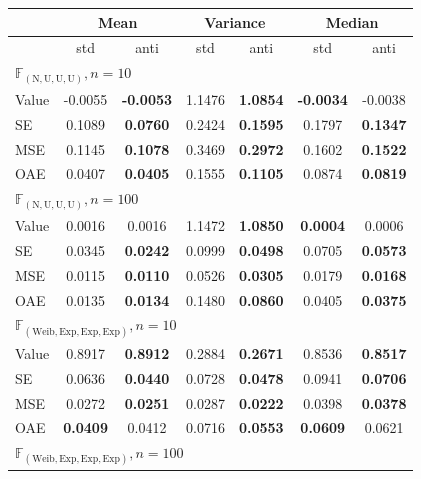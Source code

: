 \begin{table}[htbp]
\centering
\begin{tabular}{l|cc|cc|cc}
\hline
 & \multicolumn{2}{c|}{Mean} & \multicolumn{2}{c|}{Variance} & \multicolumn{2}{c}{Median} \\
  \hline
 & std & anti & std & anti & std & anti \\ 
  \hline
  
\multicolumn{7}{l}{$\mathbb{F}_{(\mathrm{N,U,U,U})}, n=10$} \\

  \hline
Value & -0.0055 & \textbf{-0.0053} & 1.1476 & \textbf{1.0854} & \textbf{-0.0034} & -0.0038 \\ 
  SE & 0.1089 & \textbf{0.0760} & 0.2424 & \textbf{0.1595} & 0.1797 & \textbf{0.1347} \\ 
  MSE & 0.1145 & \textbf{0.1078} & 0.3469 & \textbf{0.2972} & 0.1602 & \textbf{0.1522} \\ 
  OAE & 0.0407 & \textbf{0.0405} & 0.1555 & \textbf{0.1105} & 0.0874 & \textbf{0.0819} \\
   \hline
  
\multicolumn{7}{l}{$\mathbb{F}_{(\mathrm{N,U,U,U})}, n=100$} \\
  \hline
Value & 0.0016 & 0.0016 & 1.1472 & \textbf{1.0850} & \textbf{0.0004} & 0.0006 \\ 
  SE & 0.0345 & \textbf{0.0242} & 0.0999 & \textbf{0.0498} & 0.0705 & \textbf{0.0573} \\ 
  MSE & 0.0115 & \textbf{0.0110} & 0.0526 & \textbf{0.0305} & 0.0179 & \textbf{0.0168} \\ 
  OAE & 0.0135 & \textbf{0.0134} & 0.1480 & \textbf{0.0860} & 0.0405 & \textbf{0.0375} \\ 
  \hline
\multicolumn{7}{l}{$\mathbb{F}_{(\mathrm{Weib,Exp,Exp,Exp})}, n=10$} \\
  \hline
  
Value & 0.8917 & \textbf{0.8912} & 0.2884 & \textbf{0.2671} & 0.8536 & \textbf{0.8517} \\ 
  SE & 0.0636 & \textbf{0.0440} & 0.0728 & \textbf{0.0478} & 0.0941 & \textbf{0.0706} \\ 
  MSE & 0.0272 & \textbf{0.0251} & 0.0287 & \textbf{0.0222} & 0.0398 & \textbf{0.0378} \\ 
  OAE & \textbf{0.0409} & 0.0412 & 0.0716 & \textbf{0.0553} & \textbf{0.0609} & 0.0621 \\ 

  \hline
\multicolumn{7}{l}{$\mathbb{F}_{(\mathrm{Weib,Exp,Exp,Exp})}, n=100$} \\
  \hline


\end{tabular}
\end{table}
